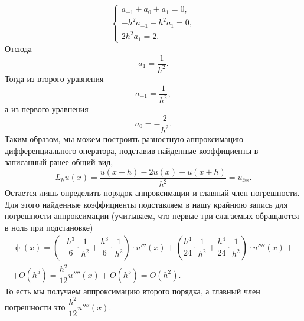 \documentclass[a4paper, 12pt]{article}
\renewcommand{\psi}{\uppsi}
\begin{document}
\begin{enumerate}
$$\begin{cases}
			a_{-1} + a_0 + a_1= 0,\\
			-h^2 a_{-1}+ h^2 a_1= 0,\\
			2h^2a_1 = 2.
		\end{cases}$$
		Отсюда $$a_1 = \dfrac{1}{h^2}.$$
		Тогда из второго уравнения $$a_{-1} = \dfrac{1}{h^2},$$ а из первого уравнения $$a_0 = -\dfrac{2}{h^2}.$$
		Таким образом, мы можем построить разностную аппроксимацию дифференциального оператора, подставив найденные коэффициенты в записанный ранее общий вид,
		$$L_h u(x) = \dfrac{u(x-h)  -2 u(x) +  u(x+h)}{h^2} = u_{\overline x x}.$$ 
		Остается лишь определить порядок аппроксимации и главный член погрешности. Для этого найденные коэффициенты подставляем в нашу крайнюю запись для погрешности аппроксимации (учитываем, что первые три слагаемых обращаются в ноль при подстановке)
		\begin{multline*}
			\psi(x) = \left(-\dfrac{h^3}{6}\cdot \dfrac{1}{h^2} +\dfrac{h^3}{6} \cdot \dfrac{1}{h^2}\right)\cdot u'''(x) + \left(\dfrac{h^4}{24}\cdot \dfrac{1}{h^2} +\dfrac{h^4}{24} \cdot \dfrac{1}{h^2}\right)\cdot u''''(x)+\\ +O(h^5) = \dfrac{h^2}{12} u''''(x) + O(h^5) = O(h^2).
		\end{multline*}
		То есть мы получаем аппроксимацию второго порядка, а главный член погрешности это $\dfrac{h^2}{12} u''''(x)$.
	

\end{enumerate}
\end{document}

